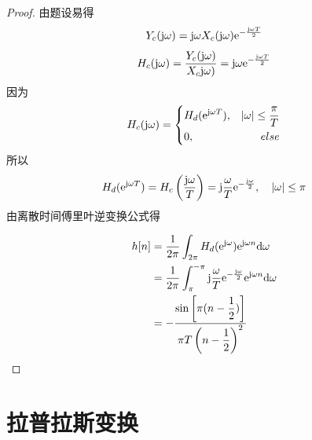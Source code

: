 \begin{proof}

    由题设易得
    $$Y_c(\mathrm{j} \omega) = \mathrm{j} \omega X_c(\mathrm{j} \omega) \mathrm{e}^{-\frac{\mathrm{j} \omega T}{2}}$$
    $$H_c(\mathrm{j} \omega) = \dfrac{Y_c(\mathrm{j} \omega)}{X_c\mathrm{j} \omega)} = \mathrm{j} \omega \mathrm{e}^{-\frac{\mathrm{j} \omega T}{2}}$$
    因为
    $$H_c(\mathrm{j} \omega) = \left\{
        \begin{aligned}
            & H_d(\mathrm{e}^{\mathrm{j} \omega T}), & |\omega| \leq \dfrac{\pi}{T} \\
            & 0, & else 
        \end{aligned}
        \right.
    $$
    所以
    $$H_d(\mathrm{e}^{\mathrm{j} \omega T}) = H_c \left( \dfrac{\mathrm{j} \omega}{T} \right) = \mathrm{j} \dfrac{\omega}{T} \mathrm{e}^{-\frac{\mathrm{j} \omega}{2}}, \quad |\omega| \leq \pi$$
    由离散时间傅里叶逆变换公式得
    
    \begin{align*}
        h[n] & = \dfrac{1}{2\pi} \int_{2\pi}{H_d(\mathrm{e}^{\mathrm{j} \omega})\mathrm{e}^{\mathrm{j} \omega n}}\mathrm{d} \omega \\
        & = \dfrac{1}{2\pi} \int_{\pi}^{-\pi}{\mathrm{j} \dfrac{\omega}{T} \mathrm{e}^{-\frac{\mathrm{j} \omega}{2}} \mathrm{e}^{\mathrm{j} \omega n}}\mathrm{d} \omega \\
        & = - \dfrac{\sin{\left[\pi (n - \dfrac{1}{2}) \right]}}{\pi T \left( n - \dfrac{1}{2} \right)^2}
    \end{align*}

\end{proof}

\section{拉普拉斯变换}

